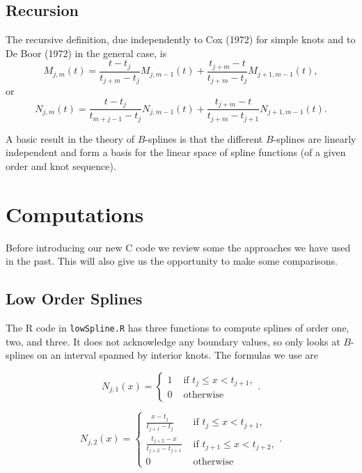 \documentclass[
  12pt,
]{article}
\begin{document}
\hypertarget{recursion}{%
\subsection{Recursion}\label{recursion}}

The recursive definition, due independently to Cox (1972) for simple
knots and to De Boor (1972) in the general case, is
\begin{equation}\label{E:Mspline}
M_{j,m}(t)=\frac{t-t_j}{t_{j+m}-t_j}M_{j,m-1}(t)+\frac{t_{j+m}-t}{t_{j+m}-t_j}M_{j+1,m-1}(t),
\end{equation} or \begin{equation}\label{E:Nspline}
N_{j,m}(t)=\frac{t-t_j}{t_{m+j-1}-t_j}N_{j,m-1}(t)+\frac{t_{j+m}-t}{t_{j+m}-t_{j+1}}N_{j+1,m-1}(t).
\end{equation}

A basic result in the theory of \(B\)-splines is that the different
\(B\)-splines are linearly independent and form a basis for the linear
space of spline functions (of a given order and knot sequence).

\hypertarget{computations}{%
\section{Computations}\label{computations}}

Before introducing our new C code we review some the approaches we have
used in the past. This will also give us the opportunity to make some
comparisons.

\hypertarget{low-order-splines}{%
\subsection{Low Order Splines}\label{low-order-splines}}

The R code in \texttt{lowSpline.R} has three functions to compute
splines of order one, two, and three. It does not acknowledge any
boundary values, so only looks at \(B\)-splines on an interval spanned
by interior knots. The formulas we use are

\[
N_{j,1}(x)=\begin{cases}1&\text{ if }t_j\leq x<t_{j+1},\\0&\text{ otherwise}\end{cases}.
\]

\[
N_{j,2}(x)=\begin{cases}\frac{x-t_j}{t_{j+1}-t_j}&\text{ if }t_j\leq x<t_{j+1},\\\frac{t_{j+2}-x}{t_{j+2}-t_{j+1}}&\text{ if }t_{j+1}\leq x<t_{j+2},\\0&\text{ otherwise}\end{cases}.
\]
\end{document}
